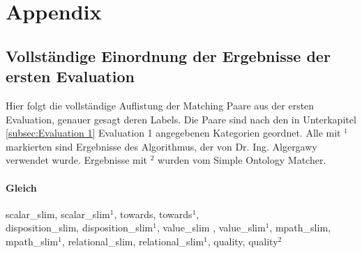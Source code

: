 %

\chapter{Appendix}
\label{ch:Appendix}

\section{Vollständige Einordnung der Ergebnisse der ersten Evaluation}
\label{app:first_appendix}
Hier folgt die vollständige Auflistung der Matching Paare aus der ersten
Evaluation, genauer gesagt deren Labels. Die Paare sind nach den in
Unterkapitel \ref{subsec:Evaluation 1} Evaluation 1 angegebenen Kategorien
geordnet. Alle mit $^1$ markierten sind Ergebnisse des Algorithmus, der von Dr. Ing. Algergawy verwendet wurde. Ergebnisse mit $^2$
wurden vom Simple Ontology Matcher.

\subsubsection{Gleich}
scalar\_slim, scalar\_slim$^1$, towards, towards$^1$,\\disposition\_slim,
disposition\_slim$^1$, value\_slim , value\_slim$^1$, mpath\_slim, mpath\_slim$^1$,
relational\_slim, relational\_slim$^1$, quality, quality$^2$


